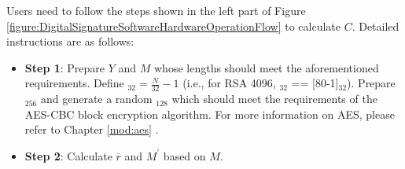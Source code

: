 \documentclass[main\_\_EN.tex]{subfiles}
\begin{document}
Users need to follow the steps shown in the left part of Figure \ref{figure:DigitalSignatureSoftwareHardwareOperationFlow} to calculate \begin{math}C\end{math}. Detailed instructions are as follows:

\begin{itemize}

    \item {\bfseries Step 1}: Prepare \begin{math}Y\end{math} and \begin{math}M\end{math} whose lengths should meet the aforementioned requirements. Define \begin{math}[L]_{32} = \frac{N}{32}-1 \end{math} (i.e., for RSA 4096, \begin{math}[L]_{32}\end{math} == [\hexprefix{}80-1]\begin{math}_{32}\end{math}). Prepare \begin{math}[RSA\_DS\_KEY]_{256}\end{math} and generate a random \begin{math}[IV]_{128}\end{math} which should meet the requirements of the AES-CBC block encryption algorithm. For more information on AES, please refer to Chapter \ref{mod:aes} \textit{}.

    \item \label{Extract M_prime and Rb} {\bfseries Step 2}: Calculate \begin{math}\overline{r}\end{math} and \begin{math}M^{\prime} \end{math} based on \begin{math}M\end{math}.


\end{itemize}
\end{document}
